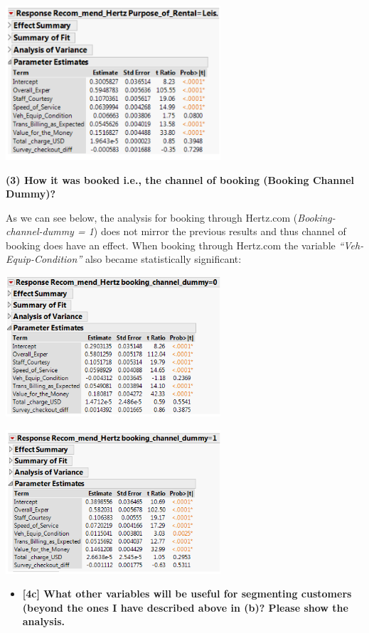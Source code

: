 \documentclass[10pt, oneside,spanish]{article}
\begin{document}
\begin{center}
\includegraphics[width=8cm]{4bii2.PNG}
\end{center}

\pagebreak

\textbf{(3) How it was booked i.e., the channel of booking (Booking Channel Dummy)?
}

As we can see below, the analysis for booking through Hertz.com (\textit{Booking-channel-dummy = 1}) does not mirror the previous results and thus channel of booking does have an effect. When booking through Hertz.com the variable \textit{“Veh-Equip-Condition”} also became statistically significant:

\begin{center}
\includegraphics[width=8cm]{4biii.PNG}
\end{center}

\begin{center}
\includegraphics[width=8cm]{4biii2.PNG}
\end{center}
\begin{itemize}
\item \textbf{ [4c]  What other variables will be useful for segmenting customers (beyond the ones I have described above in (b)? Please show the analysis.   }
\end{itemize}
\end{document}
